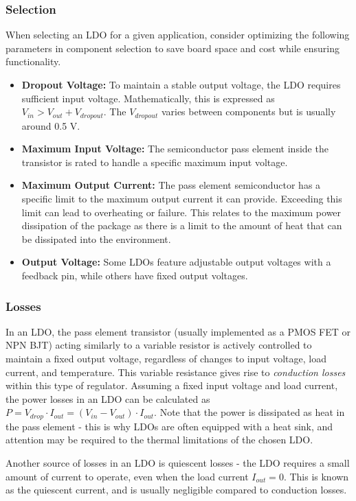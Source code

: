 \documentclass[main.tex]{subfiles}
\begin{document}
\subsubsection{Selection}
When selecting an LDO for a given application, consider optimizing the following parameters in component selection to save board space and cost while ensuring functionality. 
\begin{itemize}
    \item \textbf{Dropout Voltage:} To maintain a stable output voltage, the LDO requires sufficient input voltage. Mathematically, this is expressed as $V_{in} > V_{out} + V_{dropout}$. The $V_{dropout}$ varies between components but is usually around 0.5 V.
    \item \textbf{Maximum Input Voltage:} The semiconductor pass element inside the transistor is rated to handle a specific maximum input voltage.
    \item \textbf{Maximum Output Current:} The pass element semiconductor has a specific limit to the maximum output current it can provide. Exceeding this limit can lead to overheating or failure. This relates to the maximum power dissipation of the package as there is a limit to the amount of heat that can be dissipated into the environment. 
    \item \textbf{Output Voltage:} Some LDOs feature adjustable output voltages with a feedback pin, while others have fixed output voltages.
\end{itemize}

\subsubsection{Losses}
In an LDO, the pass element transistor (usually implemented as a PMOS FET or NPN BJT) acting similarly to a variable resistor is actively controlled to maintain a fixed output voltage, regardless of changes to input voltage, load current, and temperature. This variable resistance gives rise to \textit{conduction losses} within this type of regulator. Assuming a fixed input voltage and load current, the power losses in an LDO can be calculated as $P = V_{drop} \cdot I_{out} = (V_{in} - V_{out}) \cdot I_{out}$. Note that the power is dissipated as heat in the pass element - this is why LDOs are often equipped with a heat sink, and attention may be required to the thermal limitations of the chosen LDO. \newline

\noindent Another source of losses in an LDO is quiescent losses - the LDO requires a small amount of current to operate, even when the load current $I_{out} = 0$. This is known as the quiescent current, and is usually negligible compared to conduction losses.
\end{document}
